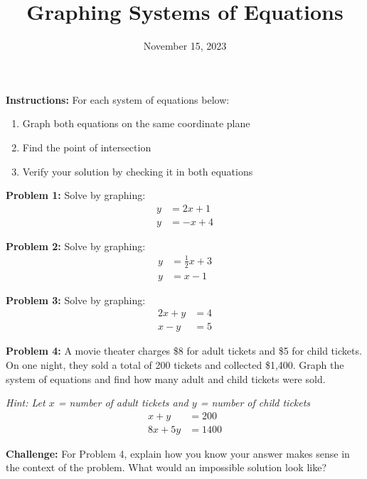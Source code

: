 \documentclass[12pt]{article}
\title{Graphing Systems of Equations}
\date{November 15, 2023}
\begin{document}
\maketitle

\textbf{Instructions:} For each system of equations below:
\begin{enumerate}
    \item Graph both equations on the same coordinate plane
    \item Find the point of intersection
    \item Verify your solution by checking it in both equations
\end{enumerate}

\vspace{0.3in}

\textbf{Problem 1:} Solve by graphing:
\begin{align*}
    y &= 2x + 1 \\
    y &= -x + 4
\end{align*}

\vspace{0.4in}

\textbf{Problem 2:} Solve by graphing:
\begin{align*}
    y &= \frac{1}{2}x + 3 \\
    y &= x - 1
\end{align*}

\vspace{0.4in}

\textbf{Problem 3:} Solve by graphing:
\begin{align*}
    2x + y &= 4 \\
    x - y &= 5
\end{align*}

\vspace{0.4in}

\textbf{Problem 4:} A movie theater charges \$8 for adult tickets and \$5 for child tickets. On one night, they sold a total of 200 tickets and collected \$1,400. Graph the system of equations and find how many adult and child tickets were sold.

\textit{Hint: Let $x$ = number of adult tickets and $y$ = number of child tickets}
\begin{align*}
    x + y &= 200 \\
    8x + 5y &= 1400
\end{align*}

\vspace{0.3in}

\textbf{Challenge:} For Problem 4, explain how you know your answer makes sense in the context of the problem. What would an impossible solution look like?
\end{document}

